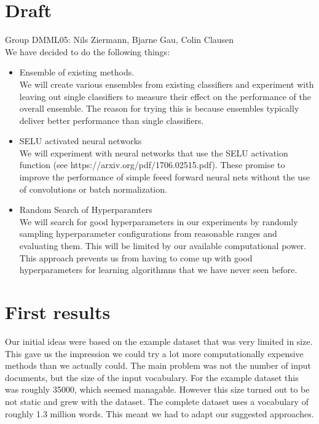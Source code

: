 \documentclass{article}
\begin{document}
\section*{Draft}
Group DMML05: Nils Ziermann, Bjarne Gau, Colin Clausen
\\
We have decided to do the following things:
\\

\begin{itemize}
\item Ensemble of existing methods.
\\
We will create various ensembles from existing classifiers and experiment with leaving out 
single classifiers to measure their effect on the performance of the overall ensemble.
The reason for trying this is because ensembles typically deliver better performance than single classifiers.

\item SELU activated neural networks
\\
We will experiment with neural networks that use the SELU activation function (see https://arxiv.org/pdf/1706.02515.pdf). These promise to improve the performance of simple feeed forward neural nets without the use of convolutions or batch normalization.

\item Random Search of Hyperparamters
\\
We will search for good hyperparameters in our experiments by randomly sampling hyperparameter configurations from reasonable ranges and evaluating them. This will be limited by our available computational power. This approach prevents us from having to come up with good hyperparameters for learning algorithmns that we have never seen before.

\end{itemize}

\section*{First results}

Our initial ideas were based on the example dataset that was very limited in size. This gave us the impression we could try a lot more computationally expensive methods than we actually could.
The main problem was not the number of input documents, but the size of the input vocabulary. For the example dataset this was roughly 35000, which seemed managable. However this size turned out to be not static and grew
with the dataset. The complete dataset uses a vocabulary of roughly 1.3 million words. This meant we had to adapt our suggested approaches.
\end{document}
